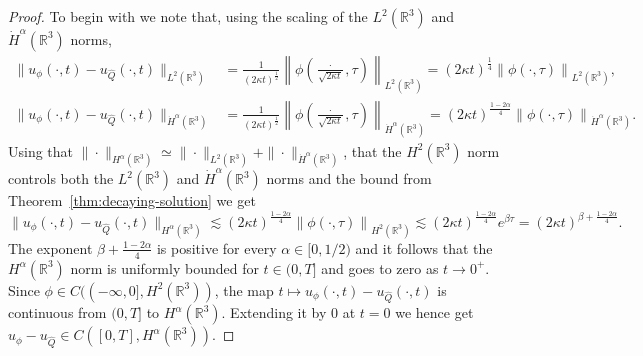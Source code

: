 \documentclass[11pt]{article}
\begin{document}
\begin{proof}
  To begin with we note that, using the scaling of the
  \(L^{2}(\mathbb{R}^{3})\) and \(\dot{H}^{\alpha}(\mathbb{R}^{3})\)
  norms,
  \begin{align*}
    \|u_{\phi}(\cdot, t) - u_{\hat{Q}}(\cdot, t)\|_{L^{2}(\mathbb{R}^{3})}
    &= \frac{1}{(2\kappa t)^{\frac{1}{2}}}
    \left\|\phi\left(\frac{\cdot}{\sqrt{2\kappa t}}, \tau\right)\right\|_{L^{2}(\mathbb{R}^{3})}
    = (2\kappa t)^{\frac{1}{4}}\left\|\phi\left(\cdot, \tau\right)\right\|_{L^{2}(\mathbb{R}^{3})},\\
    \|u_{\phi}(\cdot, t) - u_{\hat{Q}}(\cdot, t)\|_{\dot{H}^{\alpha}(\mathbb{R}^{3})}
    &= \frac{1}{(2\kappa t)^{\frac{1}{2}}}
    \left\|\phi\left(\frac{\cdot}{\sqrt{2\kappa t}}, \tau\right)\right\|_{\dot{H}^{\alpha}(\mathbb{R}^{3})}
    = (2\kappa t)^{\frac{1 - 2\alpha}{4}}\left\|\phi\left(\cdot, \tau\right)\right\|_{\dot{H}^{\alpha}(\mathbb{R}^{3})}.
  \end{align*}
  Using that
  \(\|\cdot\|_{H^{\alpha}(\mathbb{R}^{3})} \simeq
  \|\cdot\|_{L^{2}(\mathbb{R}^{3})} +
  \|\cdot\|_{\dot{H}^{\alpha}(\mathbb{R}^{3})}\), that the
  \(H^{2}(\mathbb{R}^{3})\) norm controls both the
  \(L^{2}(\mathbb{R}^{3})\) and \(\dot{H}^{\alpha}(\mathbb{R}^{3})\)
  norms and the bound from Theorem~\ref{thm:decaying-solution} we get
  \begin{equation*}
    \|u_{\phi}(\cdot, t) - u_{\hat{Q}}(\cdot, t)\|_{H^{\alpha}(\mathbb{R}^{3})}
    \lesssim (2\kappa t)^{\frac{1 - 2\alpha}{4}}
    \left\|\phi\left(\cdot, \tau\right)\right\|_{H^{2}(\mathbb{R}^{3})}
    \lesssim (2\kappa t)^{\frac{1 - 2\alpha}{4}}e^{\beta\tau}
    = (2\kappa t)^{\beta + \frac{1 - 2\alpha}{4}}.
  \end{equation*}
  The exponent \(\beta + \frac{1 - 2\alpha}{4}\) is positive for every
  \(\alpha \in [0, 1/2)\) and it follows that the
  \(H^{\alpha}(\mathbb{R}^{3})\) norm is uniformly bounded for
  \(t \in (0, T]\) and goes to zero as \(t \to 0^{+}\). Since
  \(\phi \in C((-\infty, 0], H^{2}(\mathbb{R}^{3}))\), the map
  \(t \mapsto u_{\phi}(\cdot, t) - u_{\hat{Q}}(\cdot, t)\) is
  continuous from \((0, T]\) to \(H^{\alpha}(\mathbb{R}^{3})\).
  Extending it by \(0\) at \(t = 0\) we hence get
  \(u_{\phi} - u_{\hat{Q}} \in C([0, T],
  H^{\alpha}(\mathbb{R}^{3}))\).
\end{proof}
\end{document}
